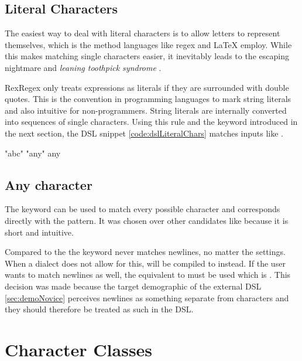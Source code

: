 \subsection{Literal Characters}

The easiest way to deal with literal characters is to allow letters to represent themselves, which is the method languages like regex and \LaTeX{} employ. While this makes matching single characters easier, it inevitably leads to the escaping nightmare and \emph{leaning toothpick syndrome} \cite{LeaningToothpick}. 

RexRegex only treats expressions as literals if they are surrounded with double quotes. This is the convention in programming languages to mark string literals and also intuitive for non-programmers. String literals are internally converted into sequences of single characters. Using this rule and the  keyword introduced in the next section, the DSL snippet \ref{code:dslLiteralChars} matches inputs like .

\vspace{5mm}
\begin{rexregexBox}[title={Literal characters in External DSL},label=code:dslLiteralChars,width=10cm,center]
"abc"
"any"
any
\end{rexregexBox}

\subsection{Any character}

The  keyword can be used to match every possible character and corresponds directly with the  pattern. It was chosen over other candidates like  because it is short and intuitive.

Compared to the  the  keyword never matches newlines, no matter the settings. When a dialect does not allow for this,  will be compiled to \pattern{[\caret\bs n]} instead. If the user wants to match newlines as well, the equivalent to  must be used which is . This decision was made because the target demographic of the external DSL \ref{sec:demoNovice} perceives newlines as something separate from characters and they should therefore be treated as such in the DSL.

\section{Character Classes} \label{sec:dslCharClasses}

